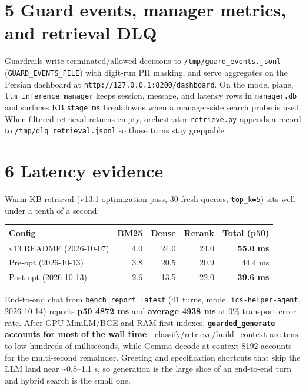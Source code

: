 \section{5 Guard events, manager metrics, and retrieval DLQ}\label{guard-events-manager-metrics-and-retrieval-dlq}

Guardrails write terminated/allowed decisions to \texttt{/tmp/guard\_events.jsonl} (\texttt{GUARD\_EVENTS\_FILE}) with digit-run PII masking, and serve aggregates on the Persian dashboard at \texttt{http://127.0.0.1:8200/dashboard}. On the model plane, \texttt{llm\_inference\_manager} keeps session, message, and latency rows in \texttt{manager.db} and surfaces KB \texttt{stage\_ms} breakdowns when a manager-side search probe is used. When filtered retrieval returns empty, orchestrator \texttt{retrieve.py} appends a record to \texttt{/tmp/dlq\_retrieval.jsonl} so those turns stay greppable.

\section{6 Latency evidence}\label{latency-evidence}

Warm KB retrieval (v13.1 optimization pass, 30 fresh queries, \texttt{top\_k=5}) sits well under a tenth of a second:

\begin{longtable}[]{@{}lrrrr@{}}
\toprule\noalign{}
Config & BM25 & Dense & Rerank & Total (p50) \\
\midrule\noalign{}
\endhead
\bottomrule\noalign{}
\endlastfoot
v13 README (2026-10-07) & 4.0 & 24.0 & 24.0 & \textbf{55.0 ms} \\
Pre-opt (2026-10-13) & 3.8 & 20.5 & 20.9 & 44.4 ms \\
Post-opt (2026-10-13) & 2.6 & 13.5 & 22.0 & \textbf{39.6 ms} \\
\end{longtable}

End-to-end chat from \texttt{bench\_report\_latest} (41 turns, model \texttt{ics-helper-agent}, 2026-10-14) reports \textbf{p50 4872 ms} and \textbf{average 4938 ms} at 0\% transport error rate. After GPU MiniLM/BGE and RAM-first indexes, \textbf{\texttt{guarded\_generate} accounts for most of the wall time}---classify/retrieve/build\_context are tens to low hundreds of milliseconds, while Gemma decode at context 8192 accounts for the multi-second remainder. Greeting and specification shortcuts that skip the LLM land near \textasciitilde0.8--1.1 s, so generation is the large slice of an end-to-end turn and hybrid search is the small one.

